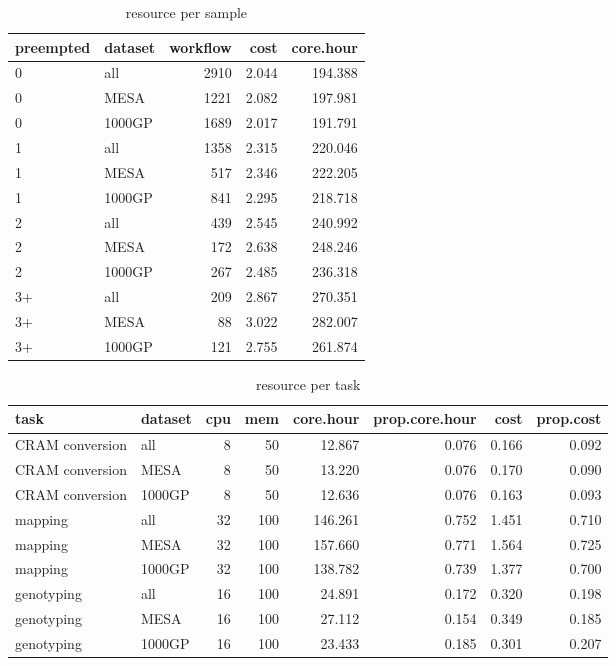 \begin{table}

\caption{\label{tab:unnamed-chunk-5}resource per sample}
\centering
\begin{tabular}[t]{l|l|r|r|r}
\hline
preempted & dataset & workflow & cost & core.hour\\
\hline
0 & all & 2910 & 2.044 & 194.388\\
\hline
0 & MESA & 1221 & 2.082 & 197.981\\
\hline
0 & 1000GP & 1689 & 2.017 & 191.791\\
\hline
1 & all & 1358 & 2.315 & 220.046\\
\hline
1 & MESA & 517 & 2.346 & 222.205\\
\hline
1 & 1000GP & 841 & 2.295 & 218.718\\
\hline
2 & all & 439 & 2.545 & 240.992\\
\hline
2 & MESA & 172 & 2.638 & 248.246\\
\hline
2 & 1000GP & 267 & 2.485 & 236.318\\
\hline
3+ & all & 209 & 2.867 & 270.351\\
\hline
3+ & MESA & 88 & 3.022 & 282.007\\
\hline
3+ & 1000GP & 121 & 2.755 & 261.874\\
\hline
\end{tabular}
\end{table}

\begin{table}

\caption{\label{tab:unnamed-chunk-5}resource per task}
\centering
\begin{tabular}[t]{l|l|r|r|r|r|r|r}
\hline
task & dataset & cpu & mem & core.hour & prop.core.hour & cost & prop.cost\\
\hline
CRAM conversion & all & 8 & 50 & 12.867 & 0.076 & 0.166 & 0.092\\
\hline
CRAM conversion & MESA & 8 & 50 & 13.220 & 0.076 & 0.170 & 0.090\\
\hline
CRAM conversion & 1000GP & 8 & 50 & 12.636 & 0.076 & 0.163 & 0.093\\
\hline
mapping & all & 32 & 100 & 146.261 & 0.752 & 1.451 & 0.710\\
\hline
mapping & MESA & 32 & 100 & 157.660 & 0.771 & 1.564 & 0.725\\
\hline
mapping & 1000GP & 32 & 100 & 138.782 & 0.739 & 1.377 & 0.700\\
\hline
genotyping & all & 16 & 100 & 24.891 & 0.172 & 0.320 & 0.198\\
\hline
genotyping & MESA & 16 & 100 & 27.112 & 0.154 & 0.349 & 0.185\\
\hline
genotyping & 1000GP & 16 & 100 & 23.433 & 0.185 & 0.301 & 0.207\\
\hline
\end{tabular}
\end{table}